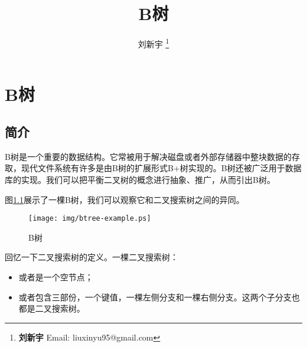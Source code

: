 \documentclass[UTF8]{article}
\begin{document}


\title{B树}

\author{刘新宇
\thanks{{\bfseries 刘新宇 } \newline
  Email: liuxinyu95@gmail.com \newline}
  }

\maketitle
\fi


\ifx\wholebook\relax
\chapter{B树}
\fi


\section{简介}
\label{introduction}

B树是一个重要的数据结构。它常被用于解决磁盘或者外部存储器中整块数据的存取\cite{CLRS}，现代文件系统有许多是由B树的扩展形式B+树实现的。B树还被广泛用于数据库的实现。我们可以把平衡二叉树的概念进行抽象、推广，从而引出B树\cite{wiki-b-tree}。

图\ref{fig:btree-example}展示了一棵B树，我们可以观察它和二叉搜索树之间的异同。

\begin{figure}[htbp]
   \begin{center}
	\texttt{[image: img/btree-example.ps]}
   \caption{B树} \label{fig:btree-example}
   \end{center}
\end{figure}

回忆一下二叉搜索树的定义。一棵二叉搜索树：
\begin{itemize}
\item 或者是一个空节点；
\item 或者包含三部份，一个键值，一棵左侧分支和一棵右侧分支。这两个子分支也都是二叉搜索树。
\end{itemize}
\end{document}
